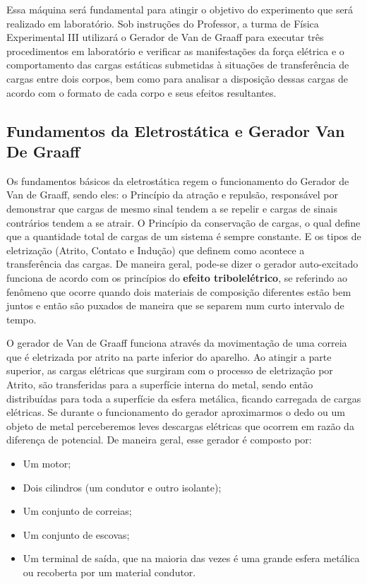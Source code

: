 \noindent Essa máquina será fundamental para atingir o objetivo do experimento que será realizado em 
laboratório. Sob instruções do Professor, a turma de Física Experimental III
utilizará o Gerador de Van de Graaff para executar três procedimentos em laboratório e 
verificar as manifestações da força elétrica e o comportamento das cargas estáticas submetidas à 
situações de transferência de cargas entre dois corpos, bem como para analisar a disposição dessas 
cargas de acordo com o formato de cada corpo e seus efeitos resultantes.

\subsection*{Fundamentos da Eletrostática e Gerador Van De Graaff}
Os fundamentos básicos da eletrostática regem o funcionamento do Gerador de Van de Graaff, 
sendo eles: o Princípio da atração e repulsão, responsável por demonstrar que cargas de mesmo 
sinal tendem a se repelir e cargas de sinais contrários tendem a se atrair. O Princípio da conservação 
de cargas, o qual define que a quantidade total de cargas de um sistema é sempre constante. E os 
tipos de eletrização (Atrito, Contato e Indução) que definem como acontece a transferência das 
cargas. De maneira geral, pode-se dizer o gerador auto-excitado funciona de acordo com os princípios do \textbf{efeito tribolelétrico}, se referindo ao fenômeno que ocorre quando dois materiais de composição diferentes estão bem juntos e então são puxados de maneira que se separem num curto intervalo de tempo.

O gerador de Van de Graaff funciona através da movimentação de uma correia que é eletrizada por 
atrito na parte inferior do aparelho. Ao atingir a parte superior, as cargas elétricas que surgiram com o processo de eletrização por Atrito, são transferidas para a superfície interna do metal, sendo então 
distribuídas para toda a superfície da esfera metálica, ficando carregada de cargas elétricas. Se durante o funcionamento do gerador aproximarmos o dedo ou um objeto de metal perceberemos leves descargas elétricas que ocorrem em razão da diferença de potencial. 
De maneira geral, esse gerador é composto por:

\begin{itemize}
    \item  Um motor; 
    \item  Dois cilindros (um condutor e outro isolante); 
    \item  Um conjunto de correias; 
    \item  Um conjunto de escovas; 
    \item  Um terminal de saída, que na maioria das vezes é uma grande esfera metálica ou recoberta por um material condutor.
\end{itemize}



